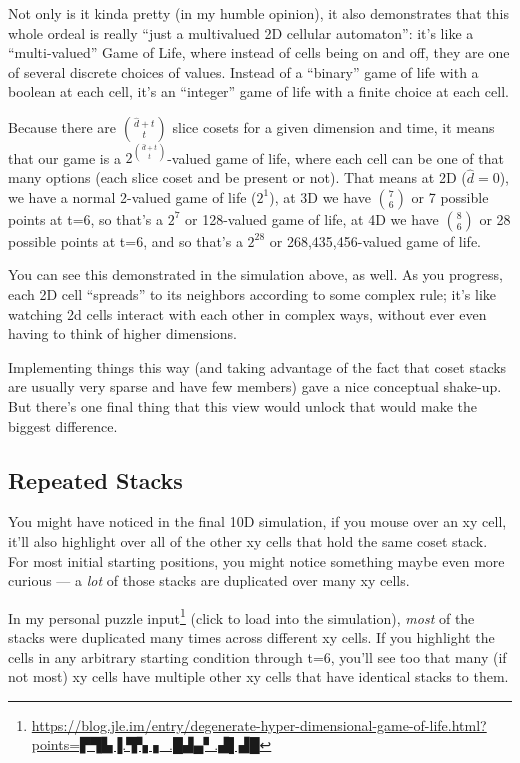 \documentclass[]{article}
\renewcommand{\href}[2]{#2\footnote{\url{#1}}}
\begin{document}
Not only is it kinda pretty (in my humble opinion), it also demonstrates that
this whole ordeal is really ``just a multivalued 2D cellular automaton'': it's
like a ``multi-valued'' Game of Life, where instead of cells being on and off,
they are one of several discrete choices of values. Instead of a ``binary'' game
of life with a boolean at each cell, it's an ``integer'' game of life with a
finite choice at each cell.

Because there are \({ {\hat{d}}+t} \choose t\) slice cosets for a given
dimension and time, it means that our game is a
\(2^{ { \hat{d} + t} \choose t }\)-valued game of life, where each cell can be
one of that many options (each slice coset and be present or not). That means at
2D (\(\hat{d} = 0\)), we have a normal 2-valued game of life (\(2^1\)), at 3D we
have \(7 \choose 6\) or 7 possible points at t=6, so that's a \(2^7\) or
128-valued game of life, at 4D we have \(8 \choose 6\) or 28 possible points at
t=6, and so that's a \(2^{28}\) or 268,435,456-valued game of life.

You can see this demonstrated in the simulation above, as well. As you progress,
each 2D cell ``spreads'' to its neighbors according to some complex rule; it's
like watching 2d cells interact with each other in complex ways, without ever
even having to think of higher dimensions.

Implementing things this way (and taking advantage of the fact that coset stacks
are usually very sparse and have few members) gave a nice conceptual shake-up.
But there's one final thing that this view would unlock that would make the
biggest difference.

\hypertarget{repeated-stacks}{%
\subsection{Repeated Stacks}\label{repeated-stacks}}

You might have noticed in the final 10D simulation, if you mouse over an xy
cell, it'll also highlight over all of the other xy cells that hold the same
coset stack. For most initial starting positions, you might notice something
maybe even more curious --- a \emph{lot} of those stacks are duplicated over
many xy cells.

In my
\href{https://blog.jle.im/entry/degenerate-hyper-dimensional-game-of-life.html?points=▛▜▙▐.▜▚▗_.█▟▄▘.▟▌▟█}{personal
puzzle input} (click to load into the simulation), \emph{most} of the stacks
were duplicated many times across different xy cells. If you highlight the cells
in any arbitrary starting condition through t=6, you'll see too that many (if
not most) xy cells have multiple other xy cells that have identical stacks to
them.
\end{document}
